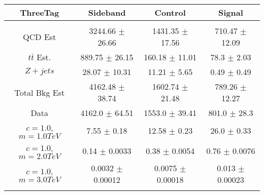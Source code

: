 \begin{footnotesize} 
\begin{tabular}{c|c|c|c} 
ThreeTag & Sideband & Control & Signal \\ 
\hline\hline 
& & & \\ 
QCD Est & 3244.66 $\pm$ 26.66 & 1431.35 $\pm$ 17.56 & 710.47 $\pm$ 12.09\\ 
$t\bar{t}$ Est.  & 889.75 $\pm$ 26.15 & 160.18 $\pm$ 11.01 & 78.3 $\pm$ 2.03\\ 
$Z+jets$ & 28.07 $\pm$ 10.31 & 11.21 $\pm$ 5.65 & 0.49 $\pm$ 0.49\\ 
Total Bkg Est & 4162.48 $\pm$ 38.74 & 1602.74 $\pm$ 21.48 & 789.26 $\pm$ 12.27\\ 
Data & 4162.0 $\pm$ 64.51 & 1553.0 $\pm$ 39.41 & 801.0 $\pm$ 28.3\\ 
$c=1.0$,$m=1.0TeV$ & 7.55 $\pm$ 0.18 & 12.58 $\pm$ 0.23 & 26.0 $\pm$ 0.33\\ 
$c=1.0$,$m=2.0TeV$ & 0.14 $\pm$ 0.0033 & 0.38 $\pm$ 0.0054 & 0.76 $\pm$ 0.0076\\ 
$c=1.0$,$m=3.0TeV$ & 0.0032 $\pm$ 0.00012 & 0.0075 $\pm$ 0.00018 & 0.013 $\pm$ 0.00023\\ 
& & & \\ 
\hline\hline 
\end{tabular} 
\end{footnotesize} 
\newline 
